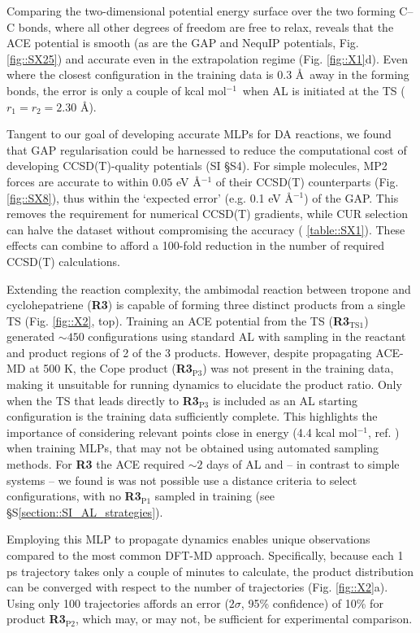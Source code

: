 \documentclass[twoside,twocolumn,9pt]{article}
\newcommand{\kcal}{kcal mol$^{-1}$}
\begin{document}
Comparing the two-dimensional potential energy surface over the two forming C–C bonds, where all other degrees of freedom are free to relax, reveals that the ACE potential is smooth (as are the GAP and NequIP potentials, Fig. \ref{fig::SX25}) and accurate even in the extrapolation regime (Fig. \ref{fig::X1}d). Even where the closest configuration in the training data is 0.3 \AA~away in the forming bonds, the error is only a couple of \kcal~when AL is initiated at the TS ($r_1=r_2=2.30$ \AA).


Tangent to our goal of developing accurate MLPs for DA reactions, we found that GAP regularisation could be harnessed to reduce the computational cost of developing CCSD(T)-quality potentials (SI §S4). For simple molecules, MP2 forces are accurate to within $0.05$ eV \AA${}^{-1}$ of their CCSD(T) counterparts (Fig. \ref{fig::SX8}), thus within the `expected error’ (e.g. 0.1 eV \AA${}^{-1}$) of the GAP. This removes the requirement for numerical CCSD(T) gradients, while CUR\cite{Mahoney2009} selection can halve the dataset without compromising the accuracy (\tablename{ \ref{table::SX1}}). These effects can combine to afford a 100-fold reduction in the number of required CCSD(T) calculations.


Extending the reaction complexity, the ambimodal reaction between tropone and cyclohepatriene ({\bfseries{R3}}) is capable of forming three distinct products from a single TS (Fig. \ref{fig::X2}, top).\cite{Jamieson2021} Training an ACE potential from the TS ({\bfseries{R3$_\text{TS1}$}}) generated $\sim450$ configurations using standard AL with sampling in the reactant and product regions of 2 of the 3 products. However, despite propagating ACE-MD at 500 K, the Cope product ({\bfseries{R3$_\text{P3}$}}) was not present in the training data, making it unsuitable for running dynamics to elucidate the product ratio. Only when the TS that leads directly to {\bfseries{R3$_\text{P3}$}} is included as an AL starting configuration is the training data sufficiently complete. This highlights the importance of considering relevant points close in energy (4.4 \kcal, ref. ) when training MLPs, that may not be obtained using automated sampling methods. For {\bfseries{R3}} the ACE required $\sim 2$ days of AL and -- in contrast to simple systems -- we found is was not possible use a distance criteria to select configurations, with no {\bfseries{R3$_\text{P1}$}} sampled in training (see §S\ref{section::SI_AL_strategies}).


Employing this MLP to propagate dynamics enables unique observations compared to the most common DFT-MD approach. Specifically, because each 1 ps trajectory takes only a couple of minutes to calculate, the product distribution can be converged with respect to the number of trajectories (Fig. \ref{fig::X2}a). Using only 100 trajectories affords an error ($2\sigma$, 95\% confidence) of 10\% for product {\bfseries{R3$_\text{P2}$}}, which may, or may not, be sufficient for experimental comparison.
\end{document}
